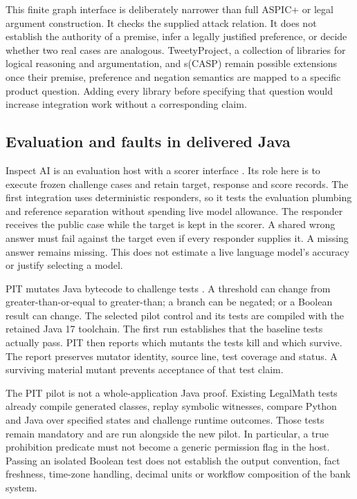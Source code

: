 \documentclass[12pt,a4paper,oneside,openany]{book}
\begin{document}
This finite graph interface is deliberately narrower than full ASPIC+ or legal
argument construction. It checks the supplied attack relation. It does not
establish the authority of a premise, infer a legally justified preference, or
decide whether two real cases are analogous. TweetyProject, a collection of
libraries for logical reasoning and argumentation, and s(CASP) remain
possible extensions once their premise, preference and negation semantics are
mapped to a specific product question. Adding every library before specifying
that question would increase integration work without a corresponding claim.

\subsection{Evaluation and faults in delivered Java}

Inspect AI is an evaluation host with a scorer interface
\citep{inspectsoftware}. Its role here is to execute frozen challenge cases and
retain target, response and score records. The first integration uses deterministic
responders, so it tests the evaluation plumbing and reference separation without
spending live model allowance. The responder receives the public case while the
target is kept in the scorer. A shared wrong answer must fail against the target
even if every responder supplies it. A missing answer remains missing. This
does not estimate a live language model's accuracy or justify selecting a model.

PIT mutates Java bytecode to challenge tests \citep{pitsoftware}. A threshold can
change from greater-than-or-equal to greater-than; a branch can be negated; or a
Boolean result can change. The selected pilot control and its tests are compiled
with the retained Java 17 toolchain. The first run establishes that the baseline
tests actually pass. PIT then reports which mutants the tests kill and which
survive. The report preserves mutator identity, source line, test coverage and
status. A surviving material mutant prevents acceptance of that test claim.

The PIT pilot is not a whole-application Java proof. Existing LegalMath tests
already compile generated classes, replay symbolic witnesses, compare Python
and Java over specified states and challenge runtime outcomes. Those tests remain
mandatory and are run alongside the new pilot. In particular, a true prohibition
predicate must not become a generic permission flag in the host. Passing an
isolated Boolean test does not establish the output convention, fact freshness,
time-zone handling, decimal units or workflow composition of the bank system.
\end{document}
